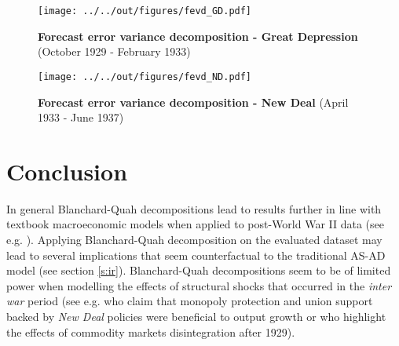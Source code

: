\begin{figure}[ht]
  \footnotesize 
  \centering
  		\texttt{[image: ../../out/figures/fevd\_GD.pdf]}
  \vspace{3mm}
  \caption[Forecast error variance decomposition - Great Depression]{\textbf{Forecast error variance decomposition - Great Depression} (October 1929 - February 1933)}
  \label{fg}
\end{figure}

\begin{figure}[ht]
  \footnotesize 
  \centering
  		\texttt{[image: ../../out/figures/fevd\_ND.pdf]}
  \vspace{3mm}
  \caption[Forecast error variance decomposition - New Deal]{\textbf{Forecast error variance decomposition - New Deal} (April 1933 - June 1937)}
  \label{fn}
\end{figure}

\clearpage

\section{Conclusion}
In general Blanchard-Quah decompositions lead to results further in line with textbook macroeconomic models when applied to post-World War II data (see e.g. \cite{blanchard2}). Applying Blanchard-Quah decomposition on the evaluated dataset may lead to several implications that seem counterfactual to the traditional AS-AD model (see section \ref{s:ir}). Blanchard-Quah decompositions seem to be of limited power when modelling the effects of structural shocks that occurred in the \textit{inter war} period (see e.g. \cite{eggertson} who claim that monopoly protection and union support backed by \textit{New Deal} policies were beneficial to output growth or \cite{comm} who highlight the effects of commodity markets disintegration after 1929). 


